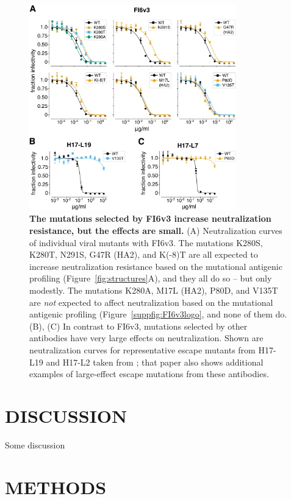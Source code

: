 \documentclass[11pt]{article}
\begin{document}
\begin{figure}
\centerline{\includegraphics[width=0.8\textwidth]{figs/FI6v3mutant_neutcurves/FI6v3_mutant_neutcurves.pdf}}
\caption{
\label{fig:FI6v3neutcurves}
{\bf The mutations selected by FI6v3 increase neutralization resistance, but the effects are small.}
(A) Neutralization curves of individual viral mutants with FI6v3.
The mutations K280S, K280T, N291S, G47R (HA2), and K(-8)T are all expected to increase neutralization resistance based on the mutational antigenic profiling (Figure~\ref{fig:structures}A), and they all do so -- but only modestly. 
The mutations K280A, M17L (HA2), P80D, and V135T are \emph{not} expected to affect neutralization based on the mutational antigenic profiling (Figure~\ref{suppfig:FI6v3logo}, and none of them do.
(B), (C) In contrast to FI6v3, mutations selected by other antibodies have very large effects on neutralization.
Shown are neutralization curves for representative escape mutants from H17-L19 and H17-L2 taken from \citet{doud2017complete}; that paper also shows additional examples of large-effect escape mutations from these antibodies.
}
\end{figure}

\section*{DISCUSSION}
Some discussion

\clearpage
\small

\section*{METHODS}
\label{sec:methods}
\end{document}
